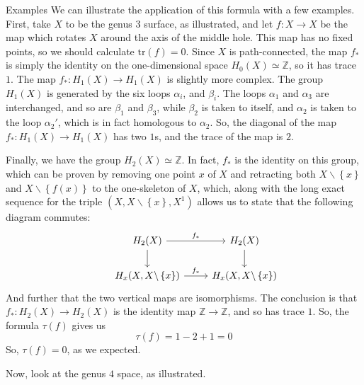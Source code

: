 \documentclass[12pt]{article}
\newcommand{\Z}{\mathbb{Z}}
\theoremstyle{definition}
\begin{document}
\begin{section}{Examples}
	We can illustrate the application of this formula with a few examples. First, take $X$ to be the genus $3$ surface, as illustrated, and let $f: X \to X$ be the map which rotates $X$ around the axis of the middle hole. This map has no fixed points, so we should calculate $\text{tr}(f) = 0$.
	Since $X$ is path-connected, the map $f_*$ is simply the identity on the one-dimensional space $H_0(X) \simeq \Z$, so it has trace $1$. The map $f_*: H_1(X) \to H_1(X)$ is slightly more complex. The group $H_1(X)$ is generated by the six loops $\alpha_i$, and $\beta_i$. The loops $\alpha_1$ and $\alpha_3$ are interchanged, and so are $\beta_1$ and $\beta_3$, while $\beta_2$ is taken to itself, and $\alpha_2$ is taken to the loop $\alpha_2'$, which is in fact homologous to $\alpha_2$. So, the diagonal of the map $f_*: H_1(X) \to H_1(X)$ has two $1$s, and the trace of the map is $2$.
	\par Finally, we have the group $H_2(X) \simeq \Z$. In fact, $f_*$ is the identity on this group, which can be proven by removing one point $x$ of $X$ and retracting both $X \backslash \left\{ x \right\}$  and $X \backslash \left\{ f(x) \right\}$ to the one-skeleton of $X$, which, along with the long exact sequence for the triple $(X, X \backslash \left\{ x \right\}, X^1)$ allows us to state that the following diagram commutes:
	\[\begin{tikzcd}&H_2(X) \arrow[r, "f_*"] \arrow[d] &H_2(X) \arrow[d]\\& H_x(X, X \backslash \left\{ x \right\}) \arrow[r, "f_*"] & H_x(X, X \backslash \left\{ x \right\})\end{tikzcd}\]
	And further that the two vertical maps are isomorphisms. The conclusion is that $f_* : H_2(X) \to H_2(X)$ is the identity map $\Z \to \Z$, and so has trace $1$. So, the formula $\tau(f)$ gives us
	\[\tau(f) = 1 - 2 + 1 = 0\]
	So, $\tau(f) = 0$, as we expected.
	\par Now, look at the genus $4$ space, as illustrated. 
\end{section}
\end{document}
